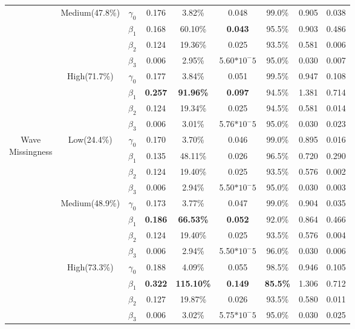 \documentclass{svjour3}                     %
\begin{document}
\begin{table}[p]
\begin{tabular}{c|c|c|cccccc}
		&\multirow{4}{*}{Medium(47.8\%)}
		& $\gamma_0$ & 0.176 & 3.82\% & 0.048 & 99.0\% & 0.905 & 0.038 \\
		&& $\beta_1$ & 0.168 & 60.10\% & \textbf{0.043} & 95.5\% & 0.903 & 0.486 \\
		&& $\beta_2$ & 0.124 & 19.36\% & 0.025 & 93.5\% & 0.581 & 0.006 \\
		&& $\beta_3$ & 0.006 & 2.95\% & 5.60$*10^-5$ & 95.0\% & 0.030 & 0.007 \\ \cline{2-9} \noalign{\smallskip}
		& \multirow{4}{*}{High(71.7\%)}
		& $\gamma_0$ & 0.177 & 3.84\% & 0.051 & 99.5\% & 0.947 & 0.108 \\
		&& $\beta_1$ & \textbf{0.257} & \textbf{91.96\%} & \textbf{0.097} & 94.5\% & 1.381 & 0.714 \\
		&& $\beta_2$ & 0.124 & 19.34\% & 0.025 & 94.5\% & 0.581 & 0.014 \\
		&& $\beta_3$ & 0.006 & 3.01\% & 5.76$*10^-5$ & 95.0\% & 0.030 & 0.023 \\
		\midrule
		\midrule
		\multirow{12}{*}{\parbox{1.75cm}{Wave \\ Missingness}}
		& \multirow{4}{*}{Low(24.4\%)}
		& $\gamma_0$ & 0.170 & 3.70\% & 0.046 & 99.0\% & 0.895 & 0.016 \\
		&& $\beta_1$ & 0.135 & 48.11\% & 0.026 & 96.5\% & 0.720 & 0.290 \\
		&& $\beta_2$ & 0.124 & 19.40\% & 0.025 & 93.5\% & 0.576 & 0.002 \\
		&& $\beta_3$ & 0.006 & 2.94\% & 5.50$*10^-5$ & 95.0\% & 0.030 & 0.003 \\ \cline{2-9} \noalign{\smallskip}
		&\multirow{4}{*}{Medium(48.9\%)}
		& $\gamma_0$ & 0.173 & 3.77\% & 0.047 & 99.0\% & 0.904 & 0.035 \\
		&& $\beta_1$ & \textbf{0.186} & \textbf{66.53\%} & \textbf{0.052} & 92.0\% & 0.864 & 0.466 \\
		&& $\beta_2$ & 0.124 & 19.40\% & 0.025 & 93.5\% & 0.576 & 0.004 \\
		&& $\beta_3$ & 0.006 & 2.94\% & 5.50$*10^-5$ & 96.0\% & 0.030 & 0.006 \\ \cline{2-9} \noalign{\smallskip}
		& \multirow{4}{*}{High(73.3\%)}
		& $\gamma_0$ & 0.188 & 4.09\% & 0.055 & 98.5\% & 0.946 & 0.105 \\
		&& $\beta_1$ & \textbf{0.322} & \textbf{115.10\%} & \textbf{0.149} & \textbf{85.5\%} & 1.306 & 0.712 \\
		&& $\beta_2$ & 0.127 & 19.87\% & 0.026 & 93.5\% & 0.580 & 0.011 \\
		&& $\beta_3$ & 0.006 & 3.02\% & 5.75$*10^-5$ & 95.0\% & 0.030 & 0.025 \\
		\bottomrule
	\end{tabular}
\end{table}
\end{document}
